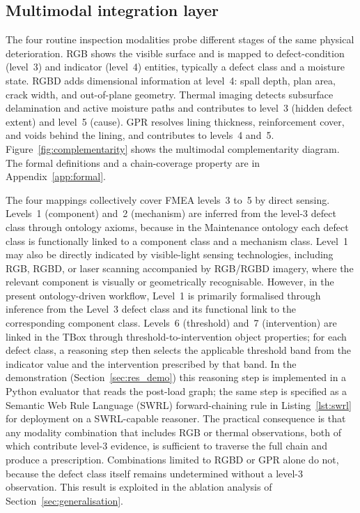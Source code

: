 \documentclass[11pt,a4paper]{article}
\begin{document}
\subsection{Multimodal integration layer}
\label{sec:integration}

The four routine inspection modalities probe different stages of the same physical deterioration. RGB shows the visible surface and is mapped to defect-condition (level~3) and indicator (level~4) entities, typically a defect class and a moisture state. RGBD adds dimensional information at level~4: spall depth, plan area, crack width, and out-of-plane geometry. Thermal imaging detects subsurface delamination and active moisture paths and contributes to level~3 (hidden defect extent) and level~5 (cause). GPR resolves lining thickness, reinforcement cover, and voids behind the lining, and contributes to levels~4 and~5. Figure~\ref{fig:complementarity} shows the multimodal complementarity diagram. The formal definitions and a chain-coverage property are in Appendix~\ref{app:formal}.

The four mappings collectively cover FMEA levels~3 to~5 by direct sensing. Levels~1 (component) and~2 (mechanism) are inferred from the level-3 defect class through ontology axioms, because in the Maintenance ontology each defect class is functionally linked to a component class and a mechanism class. Level~1 may also be directly indicated by visible-light sensing technologies, including RGB, RGBD, or laser scanning accompanied by RGB/RGBD imagery, where the relevant component is visually or geometrically recognisable. However, in the present ontology-driven workflow, Level~1 is primarily formalised through inference from the Level~3 defect class and its functional link to the corresponding component class. Levels~6 (threshold) and~7 (intervention) are linked in the TBox through threshold-to-intervention object properties; for each defect class, a reasoning step then selects the applicable threshold band from the indicator value and the intervention prescribed by that band. In the demonstration (Section~\ref{sec:res_demo}) this reasoning step is implemented in a Python evaluator that reads the post-load graph; the same step is specified as a Semantic Web Rule Language (SWRL) forward-chaining rule in Listing~\ref{lst:swrl} for deployment on a SWRL-capable reasoner. The practical consequence is that any modality combination that includes RGB or thermal observations, both of which contribute level-3 evidence, is sufficient to traverse the full chain and produce a prescription. Combinations limited to RGBD or GPR alone do not, because the defect class itself remains undetermined without a level-3 observation. This result is exploited in the ablation analysis of Section~\ref{sec:generalisation}.
\end{document}
